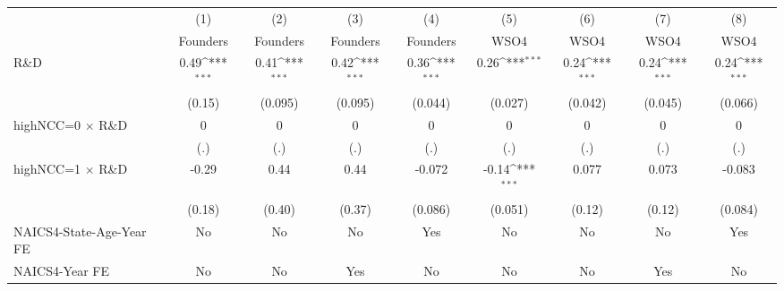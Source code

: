 {
\def\sym#1{\ifmmode^{#1}\else\(^{#1}\)\fi}
\begin{tabular}{l*{8}{c}}
\toprule
                    &\multicolumn{1}{c}{(1)}&\multicolumn{1}{c}{(2)}&\multicolumn{1}{c}{(3)}&\multicolumn{1}{c}{(4)}&\multicolumn{1}{c}{(5)}&\multicolumn{1}{c}{(6)}&\multicolumn{1}{c}{(7)}&\multicolumn{1}{c}{(8)}\\
                    &\multicolumn{1}{c}{Founders}&\multicolumn{1}{c}{Founders}&\multicolumn{1}{c}{Founders}&\multicolumn{1}{c}{Founders}&\multicolumn{1}{c}{WSO4}&\multicolumn{1}{c}{WSO4}&\multicolumn{1}{c}{WSO4}&\multicolumn{1}{c}{WSO4}\\
\midrule
R\&D                &        0.49\sym{***}&        0.41\sym{***}&        0.42\sym{***}&        0.36\sym{***}&        0.26\sym{***}&        0.24\sym{***}&        0.24\sym{***}&        0.24\sym{***}\\
                    &      (0.15)         &     (0.095)         &     (0.095)         &     (0.044)         &     (0.027)         &     (0.042)         &     (0.045)         &     (0.066)         \\
\addlinespace
highNCC=0 $\times$ R\&D&           0         &           0         &           0         &           0         &           0         &           0         &           0         &           0         \\
                    &         (.)         &         (.)         &         (.)         &         (.)         &         (.)         &         (.)         &         (.)         &         (.)         \\
\addlinespace
highNCC=1 $\times$ R\&D&       -0.29         &        0.44         &        0.44         &      -0.072         &       -0.14\sym{***}&       0.077         &       0.073         &      -0.083         \\
                    &      (0.18)         &      (0.40)         &      (0.37)         &     (0.086)         &     (0.051)         &      (0.12)         &      (0.12)         &     (0.084)         \\
\addlinespace
NAICS4-State-Age-Year FE&          No         &          No         &          No         &         Yes         &          No         &          No         &          No         &         Yes         \\
\addlinespace
NAICS4-Year FE      &          No         &          No         &         Yes         &          No         &          No         &          No         &         Yes         &          No         \\

\end{tabular}}
